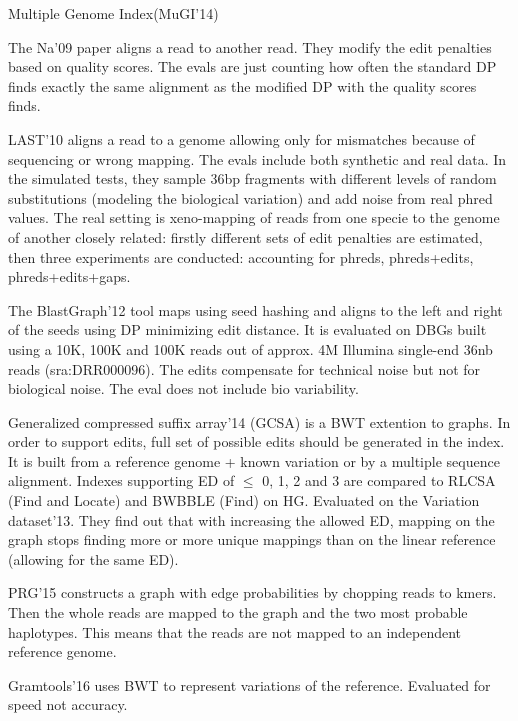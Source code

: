 Multiple Genome Index(MuGI'14)

The Na'09 paper\cite{na2009alignment} aligns a read to another read.
They modify the edit penalties based on quality scores.
The evals are just counting how often the standard DP finds exactly the same alignment as the modified DP with the quality scores finds.

LAST'10\cite{frith2010incorporating} aligns a read to a genome allowing only for mismatches because of sequencing or wrong mapping.
The evals include both synthetic and real data.
In the simulated tests, they sample 36bp fragments with different levels of random substitutions (modeling the biological variation) and add noise from real phred values.
The real setting is xeno-mapping of reads from one specie to the genome of another closely related:
	firstly different sets of edit penalties are estimated, then three experiments are conducted: accounting for phreds, phreds+edits, phreds+edits+gaps.

The BlastGraph'12\cite{holley2012blastgraph} tool maps using seed hashing and aligns to the left and right of the seeds using DP minimizing edit distance.
It is evaluated on DBGs built using a 10K, 100K and 100K reads out of approx. 4M Illumina single-end 36nb reads (sra:DRR000096).
The edits compensate for technical noise but not for biological noise. The eval does not include bio variability.

Generalized compressed suffix array'14 (GCSA) is a BWT extention to graphs.
In order to support edits, full set of possible edits should be generated in the index.
It is built from a reference genome + known variation or by a multiple sequence alignment.
Indexes supporting ED of $\leq$ 0, 1, 2 and 3 are compared to RLCSA (Find and Locate) and BWBBLE (Find) on HG.
Evaluated on the Variation dataset'13\cite{}.
They find out that with increasing the allowed ED, mapping on the graph stops finding more or more unique mappings than on the linear reference (allowing for the same ED).

PRG'15\cite{dilthey2015improved} constructs a graph with edge probabilities by chopping reads to kmers. Then the whole reads are mapped to the graph and the two most probable haplotypes. This means that the reads are not mapped to an independent reference genome.

Gramtools'16\cite{maciuca2016natural} uses BWT to represent variations of the reference. Evaluated for speed not accuracy.


